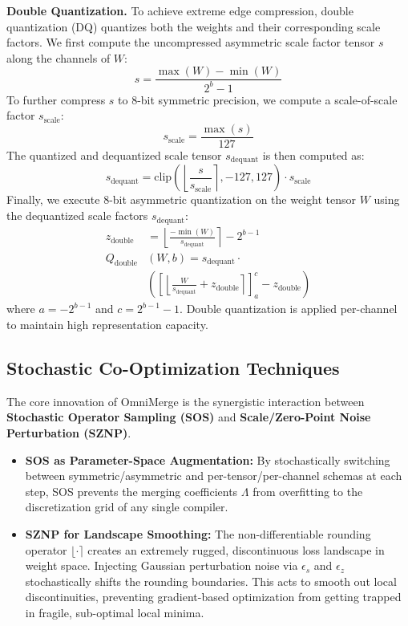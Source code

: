 \textbf{Double Quantization.}
To achieve extreme edge compression, double quantization (DQ) quantizes both the weights and their corresponding scale factors. We first compute the uncompressed asymmetric scale factor tensor $s$ along the channels of $W$:
\begin{equation}
    s = \frac{\max(W) - \min(W)}{2^b - 1}
\end{equation}
To further compress $s$ to 8-bit symmetric precision, we compute a scale-of-scale factor $s_{\text{scale}}$:
\begin{equation}
    s_{\text{scale}} = \frac{\max(s)}{127}
\end{equation}
The quantized and dequantized scale tensor $s_{\text{dequant}}$ is then computed as:
\begin{equation}
    s_{\text{dequant}} = \text{clip}\left( \left\lfloor \frac{s}{s_{\text{scale}}} \right\rceil, -127, 127 \right) \cdot s_{\text{scale}}
\end{equation}
Finally, we execute 8-bit asymmetric quantization on the weight tensor $W$ using the dequantized scale factors $s_{\text{dequant}}$:
\begin{align}
    z_{\text{double}} &= \left\lfloor \frac{-\min(W)}{s_{\text{dequant}}} \right\rceil - 2^{b-1} \\
    Q_{\text{double}}&(W, b) = s_{\text{dequant}} \cdot \nonumber \\
    &\left( \left[ \left\lfloor \frac{W}{s_{\text{dequant}}} + z_{\text{double}} \right\rceil \right]_{a}^{c} - z_{\text{double}} \right)
\end{align}
where $a = -2^{b-1}$ and $c = 2^{b-1}-1$. Double quantization is applied per-channel to maintain high representation capacity.

\subsection{Stochastic Co-Optimization Techniques}
The core innovation of OmniMerge is the synergistic interaction between \textbf{Stochastic Operator Sampling (SOS)} and \textbf{Scale/Zero-Point Noise Perturbation (SZNP)}.
\begin{itemize}
    \item \textbf{SOS as Parameter-Space Augmentation:} By stochastically switching between symmetric/asymmetric and per-tensor/per-channel schemas at each step, SOS prevents the merging coefficients $\Lambda$ from overfitting to the discretization grid of any single compiler.
    \item \textbf{SZNP for Landscape Smoothing:} The non-differentiable rounding operator $\lfloor \cdot \rceil$ creates an extremely rugged, discontinuous loss landscape in weight space. Injecting Gaussian perturbation noise via $\epsilon_s$ and $\epsilon_z$ stochastically shifts the rounding boundaries. This acts to smooth out local discontinuities, preventing gradient-based optimization from getting trapped in fragile, sub-optimal local minima.
\end{itemize}

